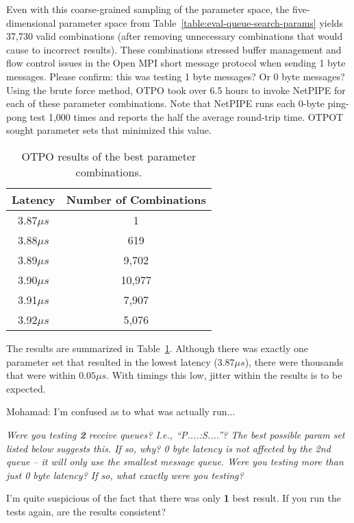 Even with this coarse-grained sampling of the parameter space, the
five-dimensional parameter space from
Table~\ref{table:eval-queue-search-params} yields 37,730 valid
combinations (after removing unnecessary combinations that would cause
to incorrect results).  These combinations stressed buffer management
and flow control issues in the Open MPI short message protocol when
sending 1 byte messages.  {\Large Please confirm: this was testing 1
  byte messages?  Or 0 byte messages?}  Using the brute force method,
OTPO took over 6.5 hours to invoke NetPIPE for each of these parameter
combinations.  Note that NetPIPE runs each 0-byte ping-pong test 1,000
times and reports the half the average round-trip time.  OTPOT sought
parameter sets that minimized this value.

\begin{table}[tb]
\centering
\caption{OTPO results of the best parameter combinations.}
\label{table:results} 
\begin{tabular}{|c|c|} \hline
Latency & Number of Combinations \\
\hline
3.87$\mu s$  & 1\\
\hline
3.88$\mu s$  & 619\\
\hline
3.89$\mu s$  & 9,702\\
\hline
3.90$\mu s$  & 10,977\\
\hline
3.91$\mu s$  & 7,907\\
\hline
3.92$\mu s$  & 5,076\\
\hline
\end{tabular}  
\end{table}

The results are summarized in Table~\ref{table:results}.  Although
there was exactly one parameter set that resulted in the lowest
latency ($3.87\mu s$), there were thousands that were within $0.05\mu
s$.  With timings this low, jitter within the results is to be
expected.  

{\Large Mohamad: I'm confused as to what was actually run...}

{\em Were you testing {\bf 2} receive queues?  I.e., ``P....:S....''?
  The best possible param set listed below suggests this.  If so, why?
  0 byte latency is not affected by the 2nd queue -- it will only use
  the smallest message queue.  Were you testing more than just 0 byte
  latency?  If so, what exactly were you testing?}

{\Large I'm quite suspicious of the fact that there was only {\bf 1}
  best result.  If you run the tests again, are the results
  consistent?}

